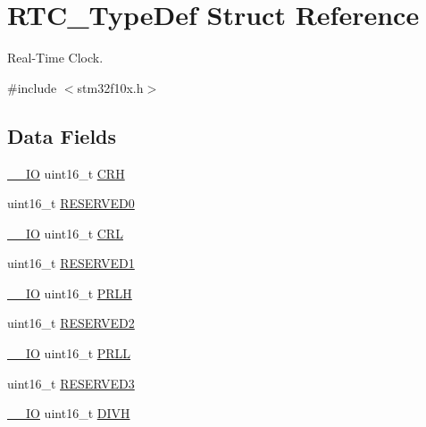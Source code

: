 \hypertarget{struct_r_t_c___type_def}{}\section{R\+T\+C\+\_\+\+Type\+Def Struct Reference}
\label{struct_r_t_c___type_def}


Real-\/\+Time Clock.  




{\ttfamily \#include $<$stm32f10x.\+h$>$}

\subsection*{Data Fields}
\begin{DoxyCompactItemize}
\item 
\mbox{\hyperlink{core__sc300_8h_aec43007d9998a0a0e01faede4133d6be}{\+\_\+\+\_\+\+IO}} uint16\+\_\+t \mbox{\hyperlink{struct_r_t_c___type_def_af8cfedf9cc6fbec8ed12ded5d8ceb64b}{C\+RH}}
\item 
uint16\+\_\+t \mbox{\hyperlink{struct_r_t_c___type_def_a149feba01f9c4a49570c6d88619f504f}{R\+E\+S\+E\+R\+V\+E\+D0}}
\item 
\mbox{\hyperlink{core__sc300_8h_aec43007d9998a0a0e01faede4133d6be}{\+\_\+\+\_\+\+IO}} uint16\+\_\+t \mbox{\hyperlink{struct_r_t_c___type_def_a17777c79f1a766332567a342de1980f7}{C\+RL}}
\item 
uint16\+\_\+t \mbox{\hyperlink{struct_r_t_c___type_def_a8249a3955aace28d92109b391311eb30}{R\+E\+S\+E\+R\+V\+E\+D1}}
\item 
\mbox{\hyperlink{core__sc300_8h_aec43007d9998a0a0e01faede4133d6be}{\+\_\+\+\_\+\+IO}} uint16\+\_\+t \mbox{\hyperlink{struct_r_t_c___type_def_a3ab2ebe47119ddfb77ba7da812fe0306}{P\+R\+LH}}
\item 
uint16\+\_\+t \mbox{\hyperlink{struct_r_t_c___type_def_a5573848497a716a9947fd87487709feb}{R\+E\+S\+E\+R\+V\+E\+D2}}
\item 
\mbox{\hyperlink{core__sc300_8h_aec43007d9998a0a0e01faede4133d6be}{\+\_\+\+\_\+\+IO}} uint16\+\_\+t \mbox{\hyperlink{struct_r_t_c___type_def_ac2dbcae3a6d32c1a4778ac99475ad355}{P\+R\+LL}}
\item 
uint16\+\_\+t \mbox{\hyperlink{struct_r_t_c___type_def_a6c3b31022e6f59b800e9f5cc2a89d54c}{R\+E\+S\+E\+R\+V\+E\+D3}}
\item 
\mbox{\hyperlink{core__sc300_8h_aec43007d9998a0a0e01faede4133d6be}{\+\_\+\+\_\+\+IO}} uint16\+\_\+t \mbox{\hyperlink{struct_r_t_c___type_def_a827fb3f1ceb1d6d1407845e7d723dc6f}{D\+I\+VH}}

\end{DoxyCompactItemize}
